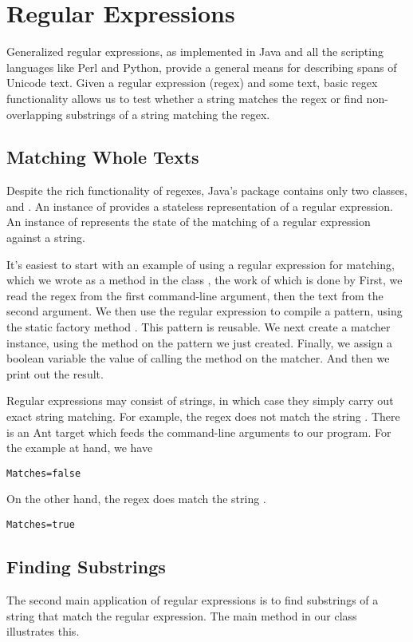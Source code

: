 \chapter{Regular Expressions}\label{chapter:regex}

Generalized regular expressions, as implemented in Java and all the
scripting languages like Perl and Python, provide a general means for
describing spans of Unicode text.  Given a regular expression (regex)
and some text, basic regex functionality allows us to test whether a
string matches the regex or find non-overlapping substrings of a
string matching the regex.

\section{Matching Whole Texts}

Despite the rich functionality of regexes, Java's
 package contains only two classes,
 and .  An instance of 
provides a stateless representation of a regular expression.  An
instance of  represents the state of the matching
of a regular expression against a string.

It's easiest to start with an example of using a regular expression
for matching, which we wrote as a
 method in the class , the work of
which is done by
%
%
First, we read the regex from the first command-line argument, then
the text from the second argument.  We then use the regular expression
to compile a pattern, using the static factory method
.  This pattern is reusable.  We next
create a matcher instance, using the method  on the
pattern we just created.  Finally, we assign a boolean variable
 the value of calling the method  
on the matcher.  And then we print out the result.


Regular expressions may consist of strings, in which case they
simply carry out exact string matching.  For example, the regex
 does not match the string .  
There is an Ant target  which feeds the command-line
arguments to our program.  For the example at hand, we have
%
\begin{verbatim}
Matches=false
\end{verbatim}
%
On the other hand, the regex  does match
the string .
%
\begin{verbatim}
Matches=true
\end{verbatim}


\section{Finding Substrings}

The second main application of regular expressions is to find
substrings of a string that match the regular expression.  The
main method in our class  illustrates this.
%
%



